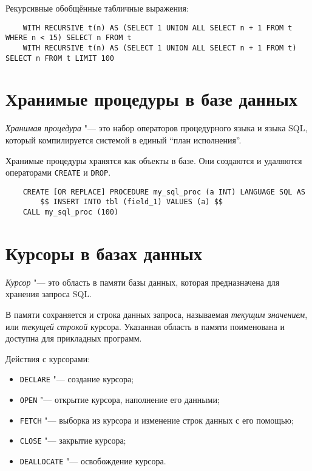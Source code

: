 Рекурсивные обобщённые табличные выражения:
\begin{verbatim}
	WITH RECURSIVE t(n) AS (SELECT 1 UNION ALL SELECT n + 1 FROM t WHERE n < 15) SELECT n FROM t
	WITH RECURSIVE t(n) AS (SELECT 1 UNION ALL SELECT n + 1 FROM t) SELECT n FROM t LIMIT 100
\end{verbatim}

\section{Хранимые процедуры в базе данных}

\begin{definition}
	\emph{Хранимая процедура} "--- это набор операторов процедурного языка и языка SQL, который компилируется системой в единый ``план исполнения''.
\end{definition}

Хранимые процедуры хранятся как объекты в базе.
Они создаются и удаляются операторами \texttt{CREATE} и \texttt{DROP}.

\begin{verbatim}
	CREATE [OR REPLACE] PROCEDURE my_sql_proc (a INT) LANGUAGE SQL AS
		$$ INSERT INTO tbl (field_1) VALUES (a) $$
	CALL my_sql_proc (100)
\end{verbatim}

\section{Курсоры в базах данных}

\begin{definition}
	\emph{Курсор} "--- это область в памяти базы данных, которая предназначена для хранения запроса SQL.
\end{definition}

В памяти сохраняется и строка данных запроса, называемая \emph{текущим значением}, или \emph{текущей строкой} курсора.
Указанная область в памяти поименована и доступна для прикладных программ.

Действия с курсорами:
\begin{itemize}
	\item \texttt{DECLARE} "--- создание курсора;
	\item \texttt{OPEN} "--- открытие курсора, \ie наполнение его данными;
	\item \texttt{FETCH} "--- выборка из курсора и изменение строк данных с его помощью;
	\item \texttt{CLOSE} "--- закрытие курсора;
	\item \texttt{DEALLOCATE} "--- освобождение курсора.
\end{itemize}

